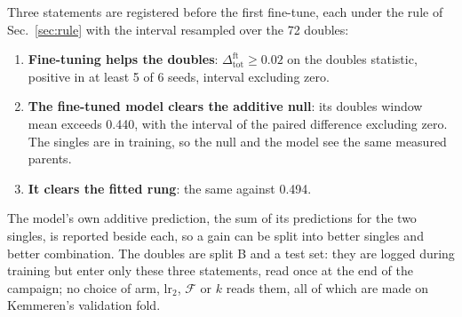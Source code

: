 Three statements are registered before the first fine-tune, each under the rule of
Sec.~\ref{sec:rule} with the interval resampled over the 72 doubles:
\begin{enumerate}[leftmargin=*,itemsep=2pt]
\item \textbf{Fine-tuning helps the doubles}: $\Delta^{\mathrm{ft}}_{\mathrm{tot}} \ge 0.02$ on the
doubles statistic, positive in at least 5 of 6 seeds, interval excluding zero.
\item \textbf{The fine-tuned model clears the additive null}: its doubles window mean exceeds
0.440, with the interval of the paired difference excluding zero. The singles are in training,
so the null and the model see the same measured parents.
\item \textbf{It clears the fitted rung}: the same against 0.494.
\end{enumerate}
The model's own additive prediction, the sum of its predictions for the two singles, is
reported beside each, so a gain can be split into better singles and better combination. The
doubles are split B and a test set: they are logged during training but enter only these three
statements, read once at the end of the campaign; no choice of arm, $\mathrm{lr}_2$, $\mathcal{F}$
or $k$ reads them, all of which are made on Kemmeren's validation fold.

